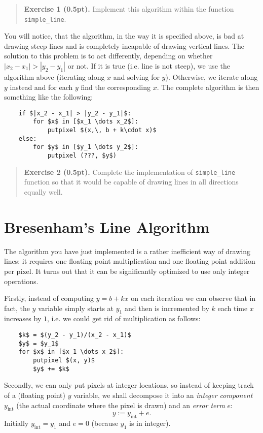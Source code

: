 \documentclass{article}
\newenvironment{exercise}[2]{\begin{verse}\textbf{Exercise #1 (#2pt).} }{
\end{verse}\medskip}
\begin{document}
\begin{exercise}{1}{0.5}
Implement this algorithm within the function \verb#simple_line#.
\end{exercise}

You will notice, that the algorithm, in the way it is specified above, is bad at drawing steep lines and is completely incapable of drawing vertical lines. The solution to this problem is to act differently, depending on whether $|x_2 - x_1| > |y_2 - y_1|$ or not. If it is true (i.e. line is not steep), we use the algorithm above (iterating along $x$ and solving for $y$). Otherwise, we iterate along $y$ instead and for each $y$ find the corresponding $x$. The complete algorithm is then something like the following:
\begin{lstlisting}
	if $|x_2 - x_1| > |y_2 - y_1|$:
		for $x$ in [$x_1 \dots x_2$]:
 			putpixel $(x,\, b + k\cdot x)$
	else:
		for $y$ in [$y_1 \dots y_2$]:
			putpixel (???, $y$)
\end{lstlisting}

\begin{exercise}{2}{0.5}
Complete the implementation of \verb#simple_line# function so that it would be capable of drawing lines in all directions equally well.
\end{exercise}

\newpage
\section{Bresenham's Line Algorithm}
The algorithm you have just implemented is a rather inefficient way of drawing lines: it requires one floating point multiplication and one floating point addition per pixel. It turns out that it can be significantly optimized to use only integer operations.

Firstly, instead of computing $y = b + kx$ on each iteration we can observe that in fact, the $y$ variable simply starts at $y_1$ and then is incremented by $k$ each time $x$ increases by $1$, i.e. we could get rid of multiplication as follows:
\begin{lstlisting}
	$k$ = $(y_2 - y_1)/(x_2 - x_1)$
	$y$ = $y_1$
	for $x$ in [$x_1 \dots x_2$]:
 		putpixel $(x, y)$
		$y$ += $k$
\end{lstlisting}

Secondly, we can only put pixels at integer locations, so instead of keeping track of a (floating point) $y$ variable, we shall decompose it into an \emph{integer component} $y_{\mathrm{int}}$ (the actual coordinate where the pixel is drawn) and an \emph{error term} $e$:
$$
 y := y_\mathrm{int} + e.
$$ 
Initially $y_\mathrm{int} = y_1$ and $e=0$ (because $y_1$ is in integer).
\end{document}
